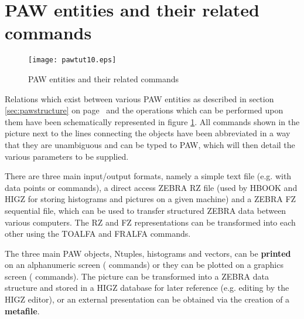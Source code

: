 \section{PAW entities and their related commands}
\label{sec:ENTITY}

\begin{figure}[!h]
\centering\texttt{[image: pawtut10.eps]}
\caption{PAW entities and their related commands}
\label{fig:PAWCOM}
\end{figure}

Relations which exist between various PAW entities as described in section 
\ref{sec:pawstructure} on page~\pageref{sec:pawstructure}
and the operations which can be performed upon them have been
schematically represented in figure \ref{fig:PAWCOM}.
All commands shown in the picture next to the lines connecting the objects
have been abbreviated in a way that
they are unambiguous and can be typed to PAW, which will then
detail the various parameters to be supplied.
 
There are three main input/output formats, namely a simple text
file (e.g. with data points or commands), a direct access ZEBRA RZ file
(used by HBOOK and HIGZ for storing histograms and pictures on a given
machine) and a ZEBRA FZ sequential file, which can be used to transfer
structured ZEBRA data between various computers.
The RZ and FZ representations can be transformed into each other
using the TOALFA and FRALFA commands.
 
The three main PAW objects, Ntuples, histograms and vectors, can be
{\bf printed} on an alphanumeric screen (
commands) or they can be plotted on a graphics screen (
commands). 
The picture can be transformed into a ZEBRA data structure
and stored in a HIGZ database for later reference (e.g. editing by the
HIGZ editor), or an external presentation can be obtained via the
creation of a {\bf metafile}. 

\endinput
